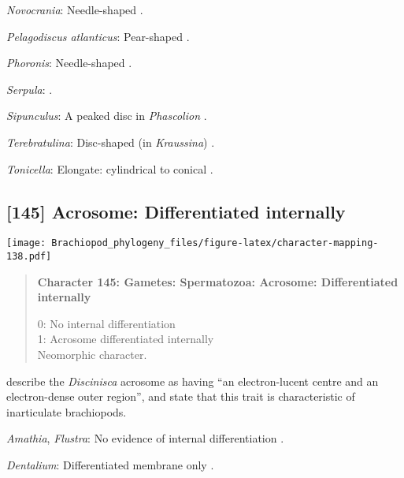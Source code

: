 \documentclass[openany]{book}
\theoremstyle{definition}
\theoremstyle{definition}
\theoremstyle{definition}
\theoremstyle{remark}
\begin{document}
\hypertarget{Novocrania-coding-144}{}
\emph{Novocrania}: Needle-shaped \citep{Afzelius1978Finestructure}.

\hypertarget{Pelagodiscus_atlanticus-coding-144}{}
\emph{Pelagodiscus atlanticus}: Pear-shaped
\citep{Hodgson1994Ultrastructureof}.

\hypertarget{Phoronis-coding-144}{}
\emph{Phoronis}: Needle-shaped \citep{Reunov2004Ultrastructuralstudy}.

\hypertarget{Serpula-coding-144}{}
\emph{Serpula}: \citet{Gherardi2011}.

\hypertarget{Sipunculus-coding-144}{}
\emph{Sipunculus}: A peaked disc in \emph{Phascolion} \citep{Rice1993}.

\hypertarget{Terebratulina-coding-144}{}
\emph{Terebratulina}: Disc-shaped (in \emph{Kraussina})
\citep{Hodgson1994Ultrastructureof}.

\hypertarget{Tonicella-coding-144}{}
\emph{Tonicella}: Elongate: cylindrical to conical
\citep{BucklandNicks1988}.

\subsection*{{[}145{]} Acrosome: Differentiated
internally}\label{acrosome-differentiated-internally}

\texttt{[image: Brachiopod\_phylogeny\_files/figure-latex/character-mapping-138.pdf]}

\begin{quote}
\textbf{Character 145: Gametes: Spermatozoa: Acrosome: Differentiated
internally}

0: No internal differentiation\\
1: Acrosome differentiated internally\\
Neomorphic character.
\end{quote}

\citet{Hodgson1994Ultrastructureof} describe the \emph{Discinisca}
acrosome as having ``an electron-lucent centre and an electron-dense
outer region'', and state that this trait is characteristic of
inarticulate brachiopods.

\hypertarget{Amathia-coding-145}{}
\emph{Amathia}, \emph{Flustra}: No evidence of internal differentiation
\citep[in \emph{Tubulipora};][]{Franzen1984}.

\hypertarget{Dentalium-coding-145}{}
\emph{Dentalium}: Differentiated membrane only \citep{DufresneDube1983}.
\end{document}

